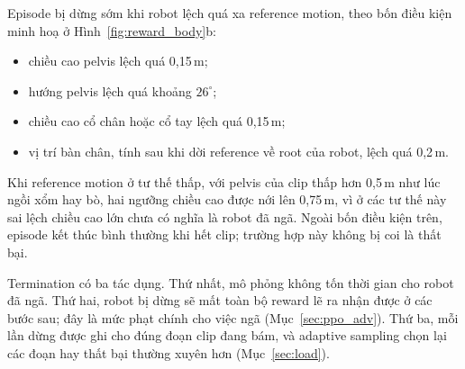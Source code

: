 \documentclass[12pt,a4paper,oneside]{report}
\begin{document}
Episode bị dừng sớm khi robot lệch quá xa reference motion, theo bốn điều kiện minh hoạ ở Hình~\ref{fig:reward_body}b:
\begin{itemize}
\item chiều cao pelvis lệch quá 0,15\,m;
\item hướng pelvis lệch quá khoảng $26^\circ$;
\item chiều cao cổ chân hoặc cổ tay lệch quá 0,15\,m;
\item vị trí bàn chân, tính sau khi dời reference về root của robot, lệch quá 0,2\,m.
\end{itemize}
Khi reference motion ở tư thế thấp, với pelvis của clip thấp hơn 0,5\,m như lúc ngồi xổm hay bò, hai ngưỡng chiều cao được nới lên 0,75\,m, vì ở các tư thế này sai lệch chiều cao lớn chưa có nghĩa là robot đã ngã. Ngoài bốn điều kiện trên, episode kết thúc bình thường khi hết clip; trường hợp này không bị coi là thất bại.

Termination có ba tác dụng. Thứ nhất, mô phỏng không tốn thời gian cho robot đã ngã. Thứ hai, robot bị dừng sẽ mất toàn bộ reward lẽ ra nhận được ở các bước sau; đây là mức phạt chính cho việc ngã (Mục~\ref{sec:ppo_adv}). Thứ ba, mỗi lần dừng được ghi cho đúng đoạn clip đang bám, và adaptive sampling chọn lại các đoạn hay thất bại thường xuyên hơn (Mục~\ref{sec:load}).
\end{document}
